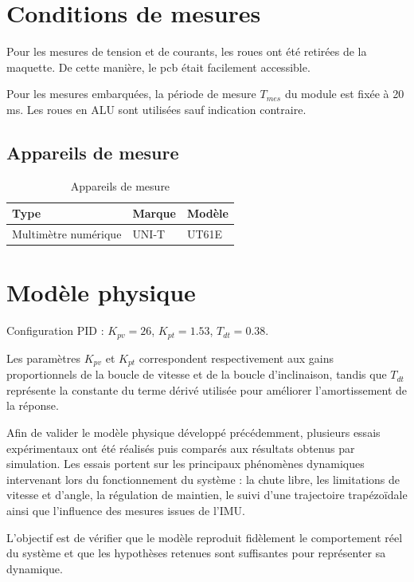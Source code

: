 \section{Conditions de mesures}
Pour les mesures de tension et de courants, les roues ont été retirées de la maquette. De cette manière, le \Gls{pcb} était facilement accessible.

Pour les mesures embarquées, la période de mesure $T_{mes}$ du module est fixée à 20 ms. Les roues en ALU sont utilisées sauf indication contraire.
\subsection{Appareils de mesure}

\begin{table}[H]
    \centering
    \begin{tabular}{|l|l|l|}
        \hline
        \textbf{Type} & \textbf{Marque} & \textbf{Modèle} \\
        \hline
        Multimètre numérique & UNI-T & UT61E \\
        \hline
    \end{tabular}
    \caption{Appareils de mesure}
    \label{tab:appareils_mesure}
\end{table}

\section{Modèle physique}

Configuration PID : $K_{pv}=26$, $K_{pt}=1.53$, $T_{dt}=0.38$.

Les paramètres $K_{pv}$ et $K_{pt}$ correspondent respectivement aux gains proportionnels de la boucle de vitesse et de la boucle d'inclinaison, tandis que $T_{dt}$ représente la constante du terme dérivé utilisée pour améliorer l'amortissement de la réponse.

Afin de valider le modèle physique développé précédemment, plusieurs essais expérimentaux ont été réalisés puis comparés aux résultats obtenus par simulation. Les essais portent sur les principaux phénomènes dynamiques intervenant lors du fonctionnement du système : la chute libre, les limitations de vitesse et d'angle, la régulation de maintien, le suivi d'une trajectoire trapézoïdale ainsi que l'influence des mesures issues de l'IMU.

L'objectif est de vérifier que le modèle reproduit fidèlement le comportement réel du système et que les hypothèses retenues sont suffisantes pour représenter sa dynamique.


